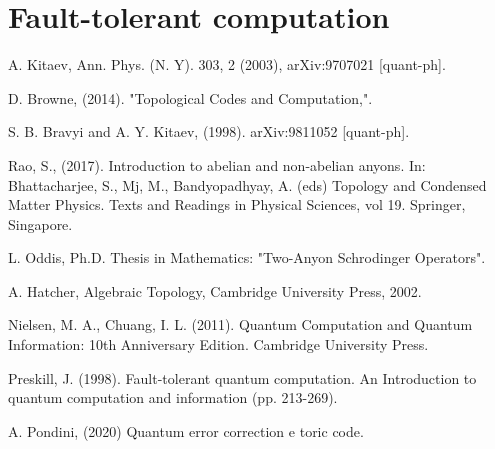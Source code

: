 \documentclass[12pt]{report}
\begin{document}
	
	\chapter{Fault-tolerant computation }
	\begin{minipage}{1 \textwidth}
		
		
		
	\end{minipage}
	
	\begin{thebibliography}{99} %
		 A. Kitaev, Ann. Phys. (N. Y). 303, 2 (2003),
		arXiv:9707021 [quant-ph].
		
		
		
		 D. Browne, (2014). "Topological Codes and Computation,".
		
		 S. B. Bravyi and A. Y. Kitaev, (1998).
		arXiv:9811052 [quant-ph].
		
		  Rao, S., (2017). Introduction to abelian and non-abelian anyons. In: Bhattacharjee, S., Mj, M., Bandyopadhyay, A. (eds) Topology and Condensed Matter Physics. Texts and Readings in Physical Sciences, vol 19. Springer, Singapore. %
		
		
		 L. Oddis, Ph.D. Thesis in Mathematics: "Two-Anyon Schrodinger Operators".
		
		 A. Hatcher, Algebraic Topology, Cambridge University Press, 2002.
		
		 Nielsen, M. A., Chuang, I. L. (2011). Quantum Computation and Quantum Information: 10th Anniversary Edition. Cambridge University Press.
		
		 Preskill, J. (1998). Fault-tolerant quantum computation. An Introduction to quantum computation and information (pp. 213-269).
		
		 A. Pondini, (2020) Quantum error correction e toric code.
		

\end{thebibliography}
\end{document}

